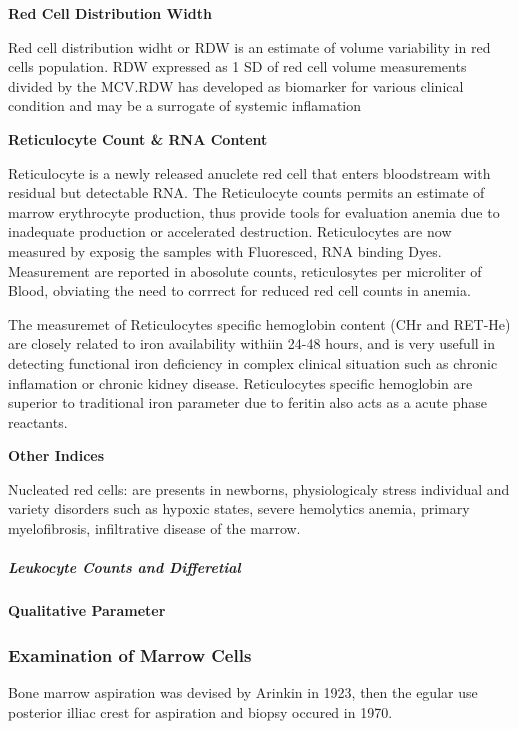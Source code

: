 \documentclass[
  letterpaper,
  DIV=11,
  numbers=noendperiod]{scrreprt}
\let\oldparagraph\paragraph
\renewcommand{\paragraph}[1]{\oldparagraph{#1}\mbox{}}
\let\oldsubparagraph\subparagraph
\renewcommand{\subparagraph}[1]{\oldsubparagraph{#1}\mbox{}}
\begin{document}
\textbf{Red Cell Distribution Width}

Red cell distribution widht or RDW is an estimate of volume variability
in red cells population. RDW expressed as 1 SD of red cell volume
measurements divided by the MCV.RDW has developed as biomarker for
various clinical condition and may be a surrogate of systemic
inflamation

\textbf{Reticulocyte Count \& RNA Content}

Reticulocyte is a newly released anuclete red cell that enters
bloodstream with residual but detectable RNA. The Reticulocyte counts
permits an estimate of marrow erythrocyte production, thus provide tools
for evaluation anemia due to inadequate production or accelerated
destruction. Reticulocytes are now measured by exposig the samples with
Fluoresced, RNA binding Dyes. Measurement are reported in abosolute
counts, reticulosytes per microliter of Blood, obviating the need to
corrrect for reduced red cell counts in anemia.

The measuremet of Reticulocytes specific hemoglobin content (CHr and
RET-He) are closely related to iron availability withiin 24-48 hours,
and is very usefull in detecting functional iron deficiency in complex
clinical situation such as chronic inflamation or chronic kidney
disease. Reticulocytes specific hemoglobin are superior to traditional
iron parameter due to feritin also acts as a acute phase reactants.

\textbf{Other Indices}

Nucleated red cells: are presents in newborns, physiologicaly stress
individual and variety disorders such as hypoxic states, severe
hemolytics anemia, primary myelofibrosis, infiltrative disease of the
marrow.

\subparagraph{Leukocyte Counts and
Differetial}\label{leukocyte-counts-and-differetial}

\paragraph{Qualitative Parameter}\label{qualitative-parameter}

\subsubsection{Examination of Marrow
Cells}\label{examination-of-marrow-cells}

Bone marrow aspiration was devised by Arinkin in 1923, then the egular
use posterior illiac crest for aspiration and biopsy occured in 1970.
\end{document}
